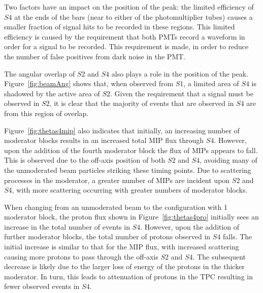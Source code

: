 Two factors have an impact on the position of the peak:
the limited efficiency of $\mathit{S4}$ at the ends of the bars (near to either of the photomultiplier tubes) causes a smaller fraction of signal hits to be recorded in these regions. 
This limited efficiency is caused by the requirement that both PMTs record a waveform in order for a signal to be recorded.
This requirement is made, in order to reduce the number of false positives from dark noise in the PMT.

The angular overlap of $\mathit{S2}$ and $\mathit{S4}$ also plays a role in the position of the peak. 
Figure~\ref{fig:beamAng} shows that, when observed from $\mathit{S1}$, a limited area of $\mathit{S4}$ is shadowed by the active area of $\mathit{S2}$.
Given the requirement that a signal must be observed in $\mathit{S2}$, it is clear that the majority of events that are observed in $\mathit{S4}$ are from this region of overlap.

Figure~\ref{fig:thetas4mip} also indicates that initially, an increasing number of moderator blocks results in an increased total MIP flux through $\mathit{S4}$. 
However, upon the addition of the fourth moderator block the flux of MIPs appears to fall.
This is observed due to the off-axis position of both $\mathit{S2}$ and $\mathit{S4}$, avoiding many of the unmoderated beam particles striking these timing points.
Due to scattering processes in the moderator, a greater number of MIPs are incident upon $\mathit{S2}$ and $\mathit{S4}$, with more scattering occurring with greater numbers of moderator blocks.

When changing from an unmoderated beam to the configuration with 1 moderator block, the proton flux shown in Figure~\ref{fig:thetas4pro} initially sees an increase in the total number of events in $\mathit{S4}$.
However, upon the addition of further moderator blocks, the total number of protons observed in $\mathit{S4}$ falls.
The initial increase is similar to that for the MIP flux, with increased scattering causing more protons to pass through the off-axis $\mathit{S2}$ and $\mathit{S4}$.
The subsequent decrease is likely due to the larger loss of energy of the protons in the thicker moderator.
In turn, this leads to attenuation of protons in the TPC resulting in fewer observed events in $\mathit{S4}$.

